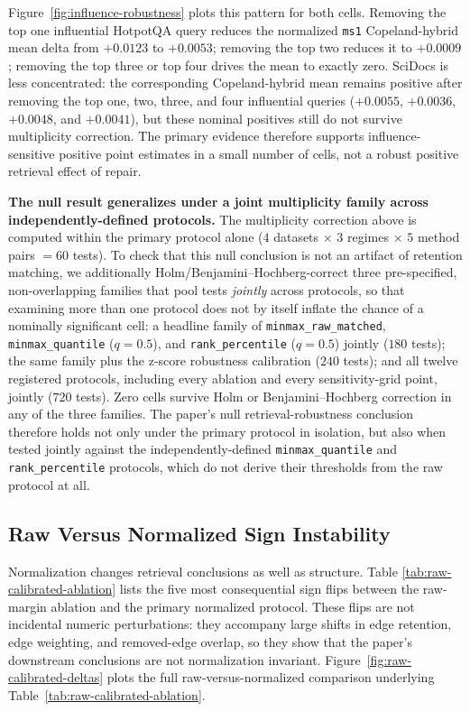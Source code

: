 \documentclass[manuscript,anonymous,review]{acmart}
\begin{document}
Figure~\ref{fig:influence-robustness} plots this pattern for both cells.
Removing the top one influential HotpotQA query reduces the normalized
\texttt{ms1} Copeland-hybrid mean delta from $+0.0123$ to $+0.0053$; removing
the top two reduces it to $+0.0009$; removing the top three or top four
drives the mean to exactly zero.
SciDocs is less concentrated: the corresponding Copeland-hybrid mean remains
positive after removing the top one, two, three, and four influential queries
($+0.0055$, $+0.0036$, $+0.0048$, and $+0.0041$), but these nominal positives
still do not survive multiplicity correction. The primary evidence therefore
supports influence-sensitive positive point estimates in a small number of
cells, not a robust positive retrieval effect of repair.

\textbf{The null result generalizes under a joint multiplicity family across
independently-defined protocols.} The multiplicity correction above is
computed within the primary protocol alone ($4$ datasets $\times$ $3$
regimes $\times$ $5$ method pairs $=60$ tests). To check that this null
conclusion is not an artifact of retention matching, we additionally
Holm/Benjamini--Hochberg-correct three pre-specified, non-overlapping
families that pool tests \emph{jointly} across protocols, so that examining
more than one protocol does not by itself inflate the chance of a nominally
significant cell: a headline family of \texttt{minmax\_raw\_matched},
\texttt{minmax\_quantile} ($q=0.5$), and \texttt{rank\_percentile}
($q=0.5$) jointly ($180$ tests); the same family plus the z-score robustness
calibration ($240$ tests); and all twelve registered protocols, including
every ablation and every sensitivity-grid point, jointly ($720$ tests). Zero
cells survive Holm or Benjamini--Hochberg correction in any of the three
families. The paper's null retrieval-robustness conclusion therefore holds
not only under the primary protocol in isolation, but also when tested
jointly against the independently-defined \texttt{minmax\_quantile} and
\texttt{rank\_percentile} protocols, which do not derive their thresholds
from the raw protocol at all.

\subsection{Raw Versus Normalized Sign Instability}

Normalization changes retrieval conclusions as well as structure. Table
\ref{tab:raw-calibrated-ablation} lists the five most consequential sign flips
between the raw-margin ablation and the primary normalized protocol. These
flips are not incidental numeric perturbations: they accompany large shifts in
edge retention, edge weighting, and removed-edge overlap, so they show that the
paper's downstream conclusions are not normalization invariant.
Figure~\ref{fig:raw-calibrated-deltas} plots the full raw-versus-normalized
comparison underlying Table~\ref{tab:raw-calibrated-ablation}.
\end{document}
